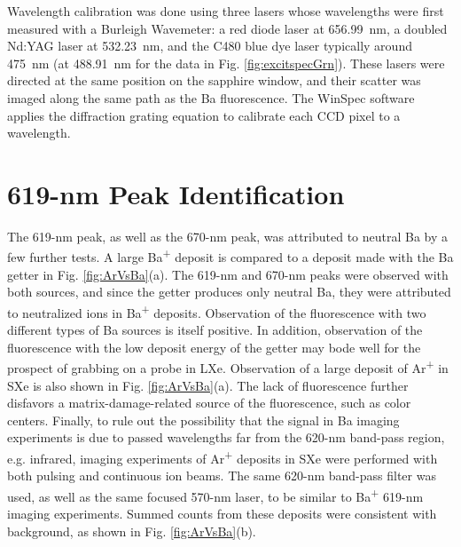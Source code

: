 
Wavelength calibration was done using three lasers whose wavelengths were first measured with a Burleigh Wavemeter:  a red diode laser at 656.99~nm, a doubled Nd:YAG laser at 532.23~nm, and the C480 blue dye laser typically around 475~nm (at 488.91~nm for the data in Fig. \ref{fig:excitspecGrn}).  These lasers were directed at the same position on the sapphire window, and their scatter was imaged along the same path as the Ba fluorescence.  The WinSpec software applies the diffraction grating equation to calibrate each CCD pixel to a wavelength.

\section{619-nm Peak Identification}
\label{sec:619identification}

The 619-nm peak, as well as the 670-nm peak, was attributed to neutral Ba by a few further tests.  A large Ba\textsuperscript{+} deposit is compared to a deposit made with the Ba getter in Fig. \ref{fig:ArVsBa}(a).  The 619-nm and 670-nm peaks were observed with both sources, and since the getter produces only neutral Ba, they were attributed to neutralized ions in Ba\textsuperscript{+} deposits.  Observation of the fluorescence with two different types of Ba sources is itself positive.  In addition, observation of the fluorescence with the low deposit energy of the getter may bode well for the prospect of grabbing on a probe in LXe.  Observation of a large deposit of Ar\textsuperscript{+} in SXe is also shown in Fig. \ref{fig:ArVsBa}(a).  The lack of fluorescence further disfavors a matrix-damage-related source of the fluorescence, such as color centers.  Finally, to rule out the possibility that the signal in Ba imaging experiments is due to passed wavelengths far from the 620-nm band-pass region, e.g. infrared, imaging experiments of Ar\textsuperscript{+} deposits in SXe were performed with both pulsing and continuous ion beams.  The same 620-nm band-pass filter was used, as well as the same focused 570-nm laser, to be similar to Ba\textsuperscript{+} 619-nm imaging experiments.  Summed counts from these deposits were consistent with background, as shown in Fig. \ref{fig:ArVsBa}(b).

